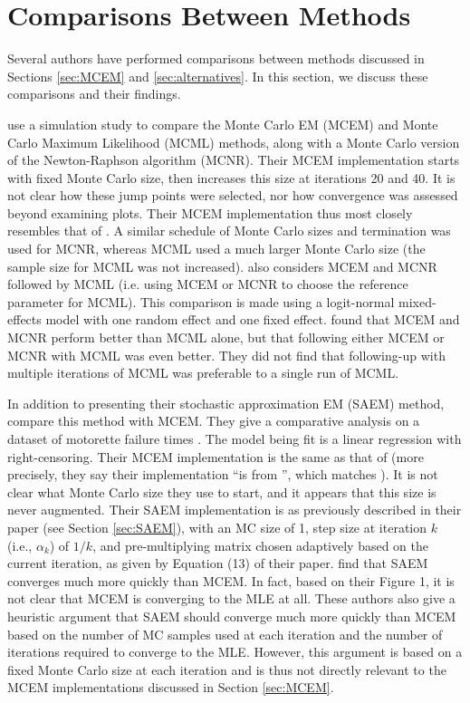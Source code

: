 \documentclass[11pt, oneside]{article}   	%
\begin{document}
\section{Comparisons Between Methods}
\label{sec:comparison}

Several authors have performed comparisons between methods discussed in Sections \ref{sec:MCEM} and \ref{sec:alternatives}. In this section, we discuss these comparisons and their findings.

\citet{McC97} use a simulation study to compare the Monte Carlo EM (MCEM) and Monte Carlo Maximum Likelihood (MCML) methods, along with a Monte Carlo version of the Newton-Raphson algorithm (MCNR). Their MCEM implementation starts with fixed Monte Carlo size, then increases this size at iterations 20 and 40. It is not clear how these jump points were selected, nor how convergence was assessed beyond examining plots. Their MCEM implementation thus most closely resembles that of \citet{Wei90}. A similar schedule of Monte Carlo sizes and termination was used for MCNR, whereas MCML used a much larger Monte Carlo size (the sample size for MCML was not increased). \citeauthor{McC97} also considers MCEM and MCNR followed by MCML (i.e. using MCEM or MCNR to choose the reference parameter for MCML). This comparison is made using a logit-normal mixed-effects model with one random effect and one fixed effect. \citeauthor{McC97} found that MCEM and MCNR perform better than MCML alone, but that following either MCEM or MCNR with MCML was even better. They did not find that following-up with multiple iterations of MCML was preferable to a single run of MCML.

In addition to presenting their stochastic approximation EM (SAEM) method, \citet{Gu98I} compare this method with MCEM. They give a comparative analysis on a dataset of motorette failure times \citep[see][for a diagram and explanation of what a motorette is]{Rai16}. The model being fit is a linear regression with right-censoring. Their MCEM implementation is the same as that of \citet{Wei90} (more precisely, they say their implementation ``is from \citet{Tan93}'', which matches \citeauthor{Wei90}). It is not clear what Monte Carlo size they use to start, and it appears that this size is never augmented. Their SAEM implementation is as previously described in their paper (see Section \ref{sec:SAEM}), with an MC size of 1, step size at iteration $k$ (i.e., $\alpha_k$) of $1/k$, and pre-multiplying matrix chosen adaptively based on the current iteration, as given by Equation (13) of their paper. \citeauthor{Gu98I} find that SAEM converges much more quickly than MCEM. In fact, based on their Figure 1, it is not clear that MCEM is converging to the MLE at all. These authors also give a heuristic argument that SAEM should converge much more quickly than MCEM based on the number of MC samples used at each iteration and the number of iterations required to converge to the MLE. However, this argument is based on a fixed Monte Carlo size at each iteration and is thus not directly relevant to the MCEM implementations discussed in Section \ref{sec:MCEM}.
\end{document}
